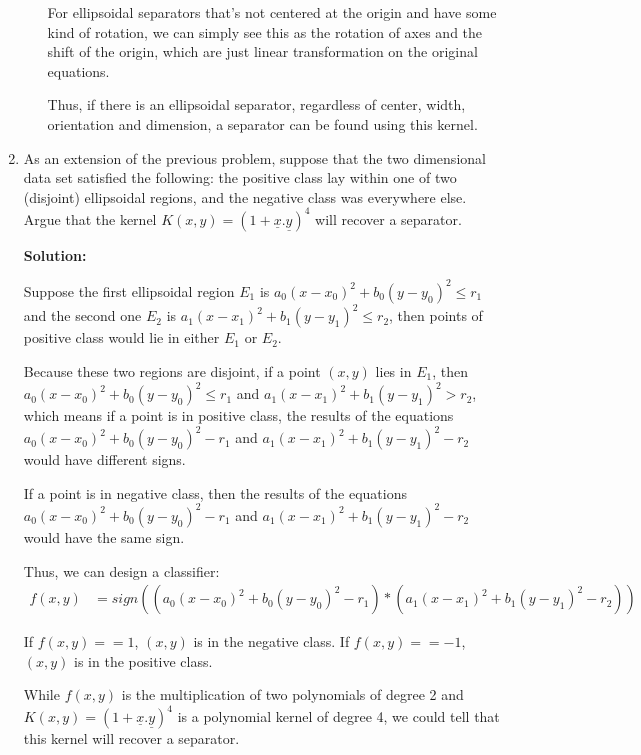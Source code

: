 \documentclass[letter, 12pt]{article}
\begin{document}
\begin{enumerate}
\begin{itemize}
    		\par{For ellipsoidal separators that's not centered at the origin and have some kind of rotation, we can simply see this as the rotation of axes and the shift of the origin, which are just linear transformation on the original equations.}
    		\par{Thus, if there is an ellipsoidal separator, regardless of center, width, orientation and dimension, a separator can be found using this kernel.}
    	\end{itemize}
    	\item{As an extension of the previous problem, suppose that the two dimensional data set satisfied the following: the
    		positive class lay within one of two (disjoint) ellipsoidal regions, and the negative class was everywhere else.
    		Argue that the kernel $ K(x, y) = (1 + \underline{x}.\underline{y})^4 $ will recover a separator.}
    	\par{\textbf{Solution:}}
    	\par{Suppose the first ellipsoidal region $ E_1 $ is $ a_0 (x - x_0)^2 + b_0 (y - y_0)^2 \le r_1 $ and the second one $ E_2 $ is $ a_1 (x - x_1)^2 + b_1 (y - y_1)^2 \le r_2 $, then points of positive class would lie in either $ E_1 $ or $ E_2 $.}
    	\par{Because these two regions are disjoint, if a point $ (x, y) $ lies in $ E_1 $, then $ a_0 (x - x_0)^2 + b_0 (y - y_0)^2 \le r_1 $ and $ a_1 (x - x_1)^2 + b_1 (y - y_1)^2 > r_2 $, which means if a point is in positive class, the results of the equations $ a_0 (x - x_0)^2 + b_0 (y - y_0)^2 - r_1 $ and $ a_1 (x - x_1)^2 + b_1 (y - y_1)^2 - r_2 $ would have different signs.}
    	\par{If a point is in negative class, then the results of the equations $ a_0 (x - x_0)^2 + b_0 (y - y_0)^2 - r_1 $ and $ a_1 (x - x_1)^2 + b_1 (y - y_1)^2 - r_2 $ would have the same sign.}
    	\par{Thus, we can design a classifier: }
    	\begin{align*}
    		f(x, y) &= sign((a_0 (x - x_0)^2 + b_0 (y - y_0)^2 - r_1) * (a_1 (x - x_1)^2 + b_1 (y - y_1)^2 - r_2)) 
    	\end{align*}
    	\par{If $ f(x, y) == 1 $, $ (x, y) $ is in the negative class. If $ f(x, y) == -1 $, $ (x, y) $ is in the positive class.}
    	\par{While $ f(x, y) $ is the multiplication of two polynomials of degree 2 and $ K(x, y) = (1 + \underline{x}.\underline{y})^4 $ is a polynomial kernel of degree 4, we could tell that this kernel will recover a separator.}
    	

\end{enumerate}
\end{document}
